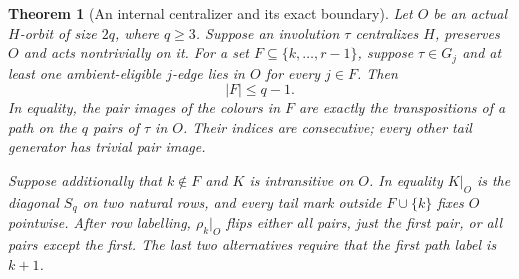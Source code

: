 \documentclass[11pt,a4paper]{article}
\newtheorem{theorem}[lemma]{Theorem}
\begin{document}
\begin{theorem}[An internal centralizer and its exact boundary]\label{internal}
Let $O$ be an actual $H$-orbit of size $2q$, where $q\ge3$.
Suppose an involution $\tau$ centralizes $H$, preserves $O$ and
acts nontrivially on it. For a set $F\subseteq\{k,\ldots,r-1\}$,
suppose $\tau\in G_j$ and at least one ambient-eligible $j$-edge
lies in $O$ for every $j\in F$. Then
\[
                        |F|\le q-1.                  \tag{2}
\]
In equality, the pair images of the colours in $F$ are exactly
the transpositions of a path on the $q$ pairs of $\tau$ in $O$.
Their indices are consecutive; every other tail generator has
trivial pair image.

Suppose additionally that $k\notin F$ and $K$ is intransitive on
$O$. In equality $K|_O$ is the diagonal $S_q$ on two natural rows,
and every tail mark outside $F\cup\{k\}$ fixes $O$ pointwise.
After row labelling, $\rho_k|_O$ flips either all pairs, just the
first pair, or all pairs except the first. The last two alternatives
require that the first path label is $k+1$.
\end{theorem}
\end{document}
